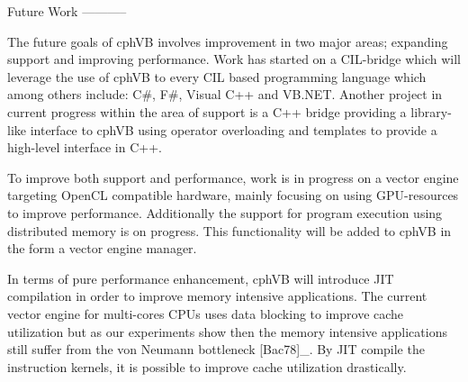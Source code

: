 
Future Work
-----------

The future goals of cphVB involves improvement in two major areas; expanding support and improving performance. Work has started on a CIL-bridge which will leverage the use of cphVB to every CIL based programming language which among others include: C\#, F\#, Visual C++ and VB.NET. Another project in current progress within the area of support is a C++ bridge providing a library-like interface to cphVB using operator overloading and templates to provide a high-level interface in C++.

To improve both support and performance, work is in progress on a vector engine targeting OpenCL compatible hardware, mainly focusing on using GPU-resources to improve performance. Additionally the support for program execution using distributed memory is on progress. This functionality will be added to cphVB in the form a vector engine manager.

In terms of pure performance enhancement, cphVB will introduce JIT compilation in order to improve memory intensive applications. The current vector engine for multi-cores CPUs uses data blocking to improve cache utilization but as our experiments show then the memory intensive applications still suffer from the von Neumann bottleneck [Bac78]_. By JIT compile the instruction kernels, it is possible to improve cache utilization drastically.
